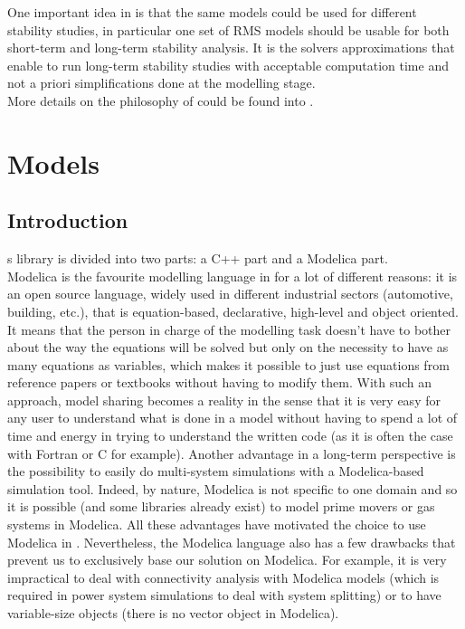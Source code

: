 \documentclass[a4paper, 12pt]{report}
\begin{document}
One important idea in \Dynawo is that the same models could be used for different stability studies, in particular one set of RMS models should be usable for both short-term and long-term stability analysis. It is the solvers approximations that enable to run long-term stability studies with acceptable computation time and not a priori simplifications done at the modelling stage. \\

More details on the philosophy of \Dynawo could be found into \cite{Dynawo}.

\section{Models}

\subsection{Introduction}

\Dynawo\textquotesingle s library is divided into two parts: a C++ part and a Modelica part. \\

Modelica is the favourite modelling language in \Dynawo for a lot of different reasons: it is an open source language, widely used in different industrial sectors (automotive, building, etc.), that is equation-based, declarative, high-level and object oriented. It means that the person in charge of the modelling task doesn't have to bother about the way the equations will be solved but only on the necessity to have as many equations as variables, which makes it possible to just use equations from reference papers or textbooks without having to modify them. With such an approach, model sharing becomes a reality in the sense that it is very easy for any user to understand what is done in a model without having to spend a lot of time and energy in trying to understand the written code (as it is often the case with Fortran or C for example). Another advantage in a long-term perspective is the possibility to easily do multi-system simulations with a Modelica-based simulation tool. Indeed, by nature, Modelica is not specific to one domain and so it is possible (and some libraries already exist) to model prime movers or gas systems in Modelica. All these advantages have motivated the choice to use Modelica in \Dynawo. Nevertheless, the Modelica language also has a few drawbacks that prevent us to exclusively base our solution on Modelica. For example, it is very impractical to deal with connectivity analysis with Modelica models (which is required in power system simulations to deal with system splitting) or to have variable-size objects (there is no vector object in Modelica). \\
\end{document}

